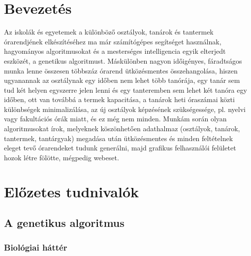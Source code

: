 \documentclass[12pt,a4paper]{report}
\begin{document}
\newpage

\pagestyle{fancy}

\section{Bevezetés}

Az iskolák és egyetemek a különböző osztályok, tanárok és tantermek órarendjének 
elkészítéséhez ma már számítógépes segítséget használnak, hagyományos algoritmusokat és a
mesterséges intelligencia egyik elterjedt eszközét, a genetikus algoritmust. Máskülönben 
nagyon időigényes, fáradtságos munka lenne összesen többszáz órarend ütközésmentes 
összehangolása, hiszen ugyanannak az osztálynak egy időben nem lehet több tanórája, egy tanár
sem tud két helyen egyszerre jelen lenni és egy tanteremben sem lehet két tanóra egy időben,
ott van továbbá a termek kapacitása, a tanárok heti óraszámai közti különbségek 
minimalizálása, az új osztályok képzésének szükségessége, pl. nyelvi vagy fakultációs órák 
miatt, és ez még nem minden. Munkám során olyan algoritmusokat írok, melyeknek köszönhetően 
adathalmaz (osztályok, tanárok, tantermek, tantárgyak) megadása után ütközésmentes és minden
feltételnek eleget tevő órarendeket tudunk generálni, majd grafikus felhasználói felületet 
hozok létre fölötte, mégpedig webeset.

\newpage

\section{Előzetes tudnivalók}

\subsection{A genetikus algoritmus}

\subsubsection{Biológiai háttér}
\end{document}
